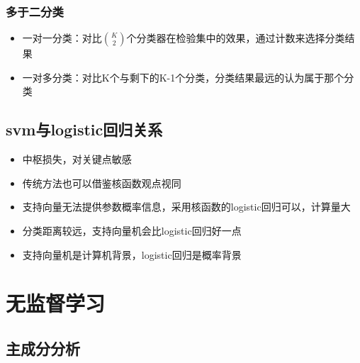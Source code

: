 \documentclass[]{book}
\providecommand{\tightlist}{%
  \setlength{\itemsep}{0pt}\setlength{\parskip}{0pt}}
\begin{document}
\hypertarget{ux591aux4e8eux4e8cux5206ux7c7b}{%
\subsubsection{多于二分类}\label{ux591aux4e8eux4e8cux5206ux7c7b}}

\begin{itemize}
\tightlist
\item
  一对一分类：对比\(K \choose 2\)个分类器在检验集中的效果，通过计数来选择分类结果
\item
  一对多分类：对比K个与剩下的K-1个分类，分类结果最远的认为属于那个分类
\end{itemize}

\hypertarget{svmux4e0elogisticux56deux5f52ux5173ux7cfb}{%
\subsection{svm与logistic回归关系}\label{svmux4e0elogisticux56deux5f52ux5173ux7cfb}}

\begin{itemize}
\tightlist
\item
  中枢损失，对关键点敏感
\item
  传统方法也可以借鉴核函数观点视同
\item
  支持向量无法提供参数概率信息，采用核函数的logistic回归可以，计算量大
\item
  分类距离较远，支持向量机会比logistic回归好一点
\item
  支持向量机是计算机背景，logistic回归是概率背景
\end{itemize}

\hypertarget{ux65e0ux76d1ux7763ux5b66ux4e60}{%
\section{无监督学习}\label{ux65e0ux76d1ux7763ux5b66ux4e60}}

\hypertarget{ux4e3bux6210ux5206ux5206ux6790}{%
\subsection{主成分分析}\label{ux4e3bux6210ux5206ux5206ux6790}}
\end{document}
